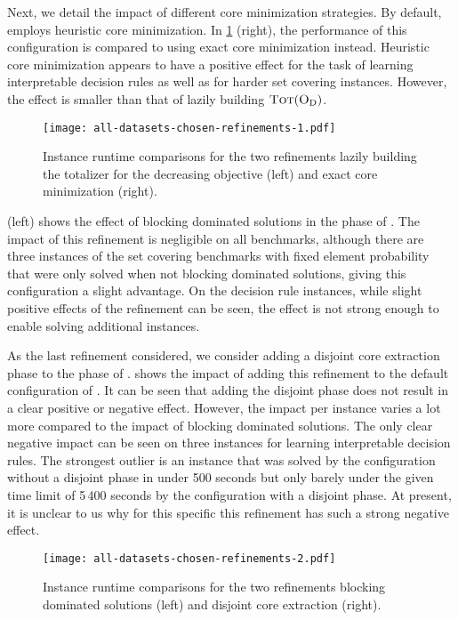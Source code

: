 Next, we detail the impact of different core minimization strategies.
By default, \msh{} employs heuristic core minimization.
In \cref{fig:refinements-1} (right), the performance of this configuration is compared to using exact core minimization instead.
Heuristic core minimization appears to have a positive effect for the task of learning interpretable decision rules as well as for harder set covering instances.
However, the effect is smaller than that of lazily building $\textsc{Tot}(\textsc{O}_{\text{D}})$.

\begin{figure}
    \centering
    \texttt{[image: all-datasets-chosen-refinements-1.pdf]}
    \caption{Instance runtime comparisons for the two refinements lazily building the totalizer for the decreasing objective (left) and exact core minimization (right).}\label{fig:refinements-1}
\end{figure}

 (left) shows the effect of blocking dominated solutions in the \satunsat{} phase of \msh{}.
The impact of this refinement is negligible on all benchmarks, although there are three instances of the set covering benchmarks with fixed element probability that were only solved when not blocking dominated solutions, giving this configuration a slight advantage.
On the decision rule instances, while slight positive effects of the refinement can be seen, the effect is not strong enough to enable solving additional instances.

As the last refinement considered, we consider adding a disjoint core extraction phase to the \msu{} phase of \msh{}.
 shows the impact of adding this refinement to the default configuration of \msh{}.
It can be seen that adding the disjoint phase does not result in a clear positive or negative effect.
However, the impact per instance varies a lot more compared to the impact of blocking dominated solutions.
The only clear negative impact can be seen on three instances for learning interpretable decision rules.
The strongest outlier is an instance that was solved by the configuration without a disjoint phase in under 500 seconds but only barely under the given time limit of 5\,400 seconds by the configuration with a disjoint phase.
At present, it is unclear to us why for this specific this refinement has such a strong negative effect.

\begin{figure}
    \centering
    \texttt{[image: all-datasets-chosen-refinements-2.pdf]}
    \caption{Instance runtime comparisons for the two refinements blocking dominated solutions (left) and disjoint core extraction (right).}\label{fig:refinements-2}
\end{figure}